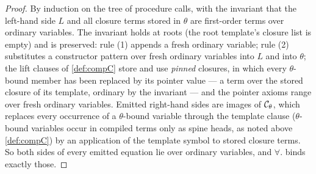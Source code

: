 \begin{proof}
By induction on the tree of procedure calls, with the invariant that
the left-hand side $L$ and all closure terms stored in $\theta$ are
first-order terms over ordinary variables.  The invariant holds at
roots (the root template's closure list is empty) and is preserved:
rule (1) appends a fresh ordinary variable; rule (2) substitutes a
constructor pattern over fresh ordinary variables into $L$ and into
$\theta$; the lift clauses of \cref{def:compC} store and use
\emph{pinned} closures, in which every $\theta$-bound member has been
replaced by its pointer value --- a term over the stored closure of
its template, ordinary by the invariant --- and the pointer axioms
range over fresh ordinary variables.  Emitted right-hand sides are
images of $\mathcal{C}_\theta$, which replaces every occurrence of a
$\theta$-bound variable through the template clause ($\theta$-bound
variables occur in compiled terms only as spine heads, as noted above
\cref{def:compC}) by an application of the template symbol to stored
closure terms.  So both sides of every emitted equation lie over
ordinary variables, and $\forall.$ binds exactly those.
\end{proof}

